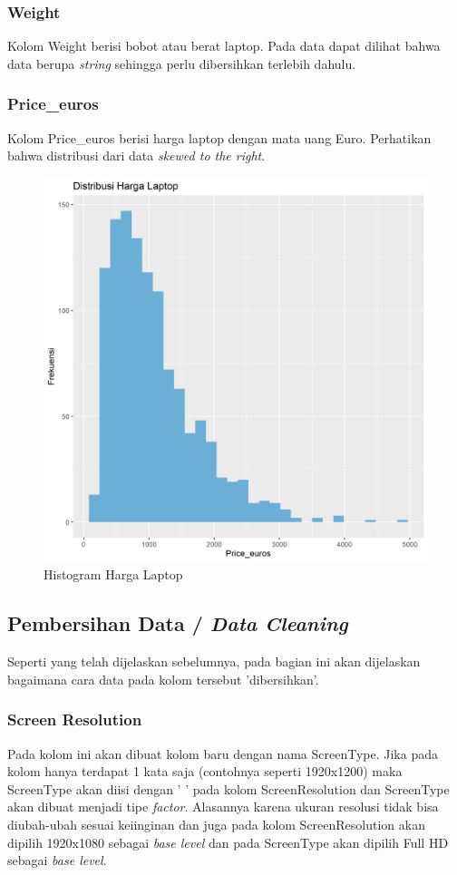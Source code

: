 \documentclass[12pt]{article}
\begin{document}
\subsubsection{Weight}
Kolom Weight berisi bobot atau berat laptop. Pada data dapat dilihat bahwa data berupa \textit{string} sehingga perlu dibersihkan terlebih dahulu.
\subsubsection{Price\_euros}
Kolom Price\_euros berisi harga laptop dengan mata uang Euro. Perhatikan bahwa distribusi dari data \textit{skewed to the right}. 
\begin{figure}[h!]
    \centering
    \includegraphics[scale = 0.4]{distplot.png}
    \caption{Histogram Harga Laptop }
    \label{ahay}
\end{figure}
\newpage
\subsection{Pembersihan Data / \textit{Data Cleaning}}
Seperti yang telah dijelaskan sebelumnya, pada bagian ini akan dijelaskan bagaimana cara data pada kolom tersebut 'dibersihkan'.
\subsubsection{Screen Resolution}
Pada kolom ini akan dibuat kolom baru dengan nama ScreenType. Jika pada kolom hanya terdapat 1 kata saja (contohnya seperti 1920x1200) maka ScreenType akan diisi dengan ' ' pada kolom ScreenResolution dan ScreenType akan dibuat menjadi tipe \textit{factor}. Alasannya karena ukuran resolusi tidak bisa diubah-ubah sesuai keiinginan dan juga pada kolom ScreenResolution akan dipilih 1920x1080 sebagai \textit{base level} dan pada ScreenType akan dipilih Full HD sebagai \textit{base level}.
\end{document}
